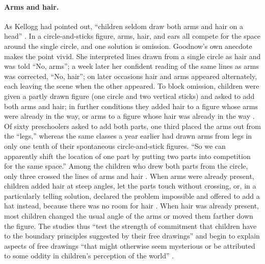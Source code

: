\documentclass[11pt]{article}
\theoremstyle{remark}
\begin{document}
\paragraph{Arms and hair.} As Kellogg had pointed out, ``children seldom draw both arms and hair on a head'' \cite[p.~50]{goodnow1977}. In a circle-and-sticks figure, arms, hair, and ears all compete for the space around the single circle, and one solution is omission. Goodnow's own anecdote makes the point vivid. She interpreted lines drawn from a single circle as hair and was told ``No, arms''; a week later her confident reading of the same lines as arms was corrected, ``No, hair''; on later occasions hair and arms appeared alternately, each leaving the scene when the other appeared. To block omission, children were given a partly drawn figure (one circle and two vertical sticks) and asked to add both arms and hair; in further conditions they added hair to a figure whose arms were already in the way, or arms to a figure whose hair was already in the way \cite[p.~51]{goodnow1977}. Of sixty preschoolers asked to add both parts, one third placed the arms out from the ``legs,'' whereas the same classes a year earlier had drawn arms from legs in only one tenth of their spontaneous circle-and-stick figures. ``So we can apparently shift the location of one part by putting two parts into competition for the same space.'' Among the children who drew both parts from the circle, only three crossed the lines of arms and hair \cite[p.~52]{goodnow1977}. When arms were already present, children added hair at steep angles, let the parts touch without crossing, or, in a particularly telling solution, declared the problem impossible and offered to add a hat instead, because there was no room for hair \cite[pp.~53--54]{goodnow1977}. When hair was already present, most children changed the usual angle of the arms or moved them farther down the figure. The studies thus ``test the strength of commitment that children have to the boundary principles suggested by their free drawings'' and begin to explain aspects of free drawings ``that might otherwise seem mysterious or be attributed to some oddity in children's perception of the world'' \cite[p.~54]{goodnow1977}.
\end{document}
